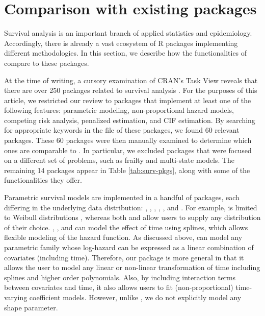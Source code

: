 \hypertarget{comparison-with-existing-packages}{%
\section{Comparison with existing
packages}\label{comparison-with-existing-packages}}

Survival analysis is an important branch of applied statistics and
epidemiology. Accordingly, there is already a vast ecosystem of R
packages implementing different methodologies. In this section, we
describe how the functionalities of  compare to these
packages.

At the time of writing, a cursory examination of CRAN's 
Task View reveals that there are over 250 packages related to survival
analysis \citep{survTaskView}. For the purposes of this article, we
restricted our review to packages that implement at least one of the
following features: parametric modeling, non-proportional hazard models,
competing risk analysis, penalized estimation, and CIF estimation. By
searching for appropriate keywords in the  file of
these packages, we found 60 relevant packages. These 60 packages were
then manually examined to determine which ones are comparable to
. In particular, we excluded packages that were focused on
a different set of problems, such as frailty and multi-state models. The
remaining 14 packages appear in Table \ref{tab:surv-pkgs}, along with
some of the functionalities they offer.

Parametric survival models are implemented in a handful of packages,
each differing in the underlying data distribution: 
\citeyearpar{mahani2015bayesian}, 
\citeyearpar{flexsurv}, 
\citeyearpar{smoothHazard},  \citeyearpar{clements_liu},
 \citeyearpar{scheike2014estimating}, and
 \citeyearpar{survival-package}. For example,
 is limited to Weibull distributions
\citeyearpar{smoothHazard}, whereas both  and
 allow users to supply any distribution of their choice.
, ,  and  can
model the effect of time using splines, which allows flexible modeling
of the hazard function. As discussed above,  can model any
parametric family whose log-hazard can be expressed as a linear
combination of covariates (including time). Therefore, our package is
more general in that it allows the user to model any linear or
non-linear transformation of time including splines and higher order
polynomials. Also, by including interaction terms between covariates and
time, it also allows users to fit (non-proportional) time-varying
coefficient models. However, unlike , we do not explicitly
model any shape parameter.

